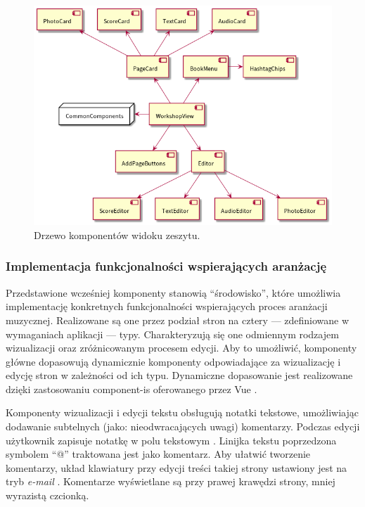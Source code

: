 \begin{figure}[H]
	\begin{center}
		\includegraphics[scale=0.6]{media/WorkshopComponents.png}
	\end{center}
	\caption{Drzewo komponentów widoku zeszytu.}
	\label{rys:workshop-components}
\end{figure}

\subsubsection{Implementacja funkcjonalności wspierających aranżację}
Przedstawione wcześniej komponenty stanowią \enquote{środowisko}, które umożliwia implementację konkretnych funkcjonalności
wspierających proces aranżacji muzycznej. Realizowane są one przez podział stron na cztery — zdefiniowane w wymaganiach aplikacji — typy.
Charakteryzują się one odmiennym rodzajem wizualizacji oraz zróżnicowanym procesem edycji. Aby to umożliwić, komponenty główne
dopasowują dynamicznie komponenty odpowiadające za wizualizację i edycję stron w zależności od ich typu.
Dynamiczne dopasowanie jest realizowane dzięki zastosowaniu component-is oferowanego przez Vue \cite{vue}.

Komponenty wizualizacji i edycji tekstu obsługują notatki tekstowe, umożliwiając dodawanie subtelnych (jako: nieodwracających uwagi)
komentarzy. Podczas edycji użytkownik zapisuje notatkę w polu tekstowym \cite{ionic}. Linijka tekstu poprzedzona symbolem \enquote{@} traktowana jest
jako komentarz. Aby ułatwić tworzenie komentarzy, układ klawiatury przy edycji treści takiej strony ustawiony jest na tryb \textit{e-mail} \cite{ionic}.
Komentarze wyświetlane są przy prawej krawędzi strony, mniej wyrazistą czcionką.

